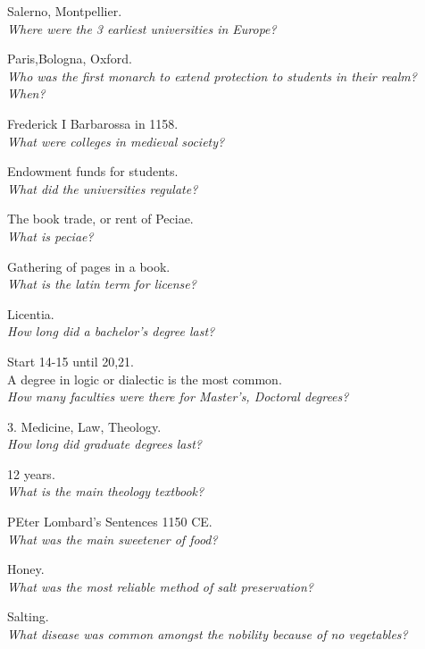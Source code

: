 \documentclass[12pt]{article}
\begin{document}
Salerno, Montpellier.\\

\textit{Where were the 3 earliest universities in Europe?}

Paris,Bologna, Oxford.\\

\textit{Who was the first monarch to extend protection to students in their realm? When?}

Frederick I Barbarossa in 1158.\\

\textit{What were colleges in medieval society?}

Endowment funds for students.\\

\textit{What did the universities regulate?}

The book trade, or rent of Peciae.\\

\textit{What is peciae?}

Gathering of pages in a book.\\

\textit{What is the latin term for license?}

Licentia.\\

\textit{How long did a bachelor's degree last?}

Start 14-15 until 20,21.\\ A degree in logic or dialectic is the most common.\\

\textit{How many faculties were there for Master's, Doctoral degrees?}

3. Medicine, Law, Theology.\\

\textit{How long did graduate degrees last?}

12 years.\\

\textit{What is the main theology textbook?}

PEter Lombard's Sentences 1150 CE.\\

\textit{What was the main sweetener of food?}

Honey.\\

\textit{What was the most reliable method of salt preservation?}

Salting.\\

\textit{What disease was common amongst the nobility because of no vegetables?}
\end{document}

